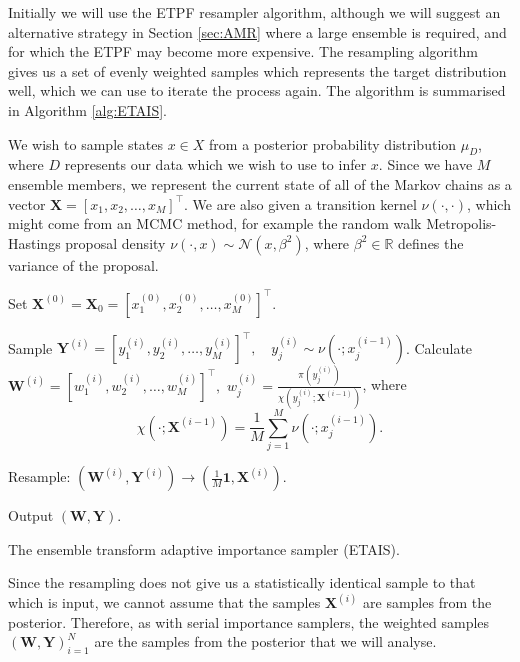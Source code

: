 \documentclass[final]{siamltex}
\newcommand{\X}{{\mathbf X}}
\newcommand{\Y}{{\mathbf Y}}
\newcommand{\W}{{\mathbf W}}
\begin{document}
Initially we
will use the ETPF resampler algorithm\cite{reich2013nonparametric}, although we
will suggest an alternative strategy in Section \ref{sec:AMR} where a
large ensemble is required, and for which the ETPF may become more expensive. The
resampling algorithm gives us a set of evenly weighted samples which
represents the target distribution well, which we can use to iterate
the process again. The algorithm is summarised in Algorithm
\ref{alg:ETAIS}.

We wish to sample states $x \in X$ from a posterior
probability distribution $\mu_D$, where $D$ represents our data which
we wish to use to infer $x$. Since we have $M$ ensemble members, we
represent the current state of all of the Markov chains as a vector
$\X = [x_1,x_2,\ldots,x_M]^\top$. We are also given a transition kernel
$\nu(\cdot,\cdot)$, which might come from an MCMC method, for example
the random walk Metropolis-Hastings proposal density $\nu(\cdot,x) \sim
\mathcal{N}(x,\beta^2)$, where $\beta^2\in \mathbb{R}$ defines the
variance of the proposal.

\begin{table}[!ht]
\centering
\begin{algorithm}[H]
\DontPrintSemicolon
\BlankLine
	Set $\X^{(0)} = \X_0 = [x_1^{(0)},x_2^{(0)},\ldots,x_M^{(0)}]^\top$.\;
	{
		Sample $\Y^{(i)} = [y_1^{(i)},y_2^{(i)},\ldots,y_M^{(i)}]^\top, \quad y_j^{(i)} \sim
\nu(\cdot;x_j^{(i-1)})$.\label{algline:ETAIS_propose}\;
		Calculate $\W^{(i)} = [w_1^{(i)},w_2^{(i)},\ldots,w_M^{(i)}]^\top,$ \quad $w^{(i)}_j =
\frac{\pi(y_j^{(i)})}{\chi(y_j^{(i)};\X^{(i-1)})}$, where
		\[
			\chi(\cdot;\X^{(i-1)}) = \frac{1}{M}\sum_{j=1}^M \nu(\cdot;x_j^{(i-1)}).
		\]

		Resample: $(\W^{(i)},\Y^{(i)}) \rightarrow (\frac{1}{M}\mathbf{1}, \X^{(i)})$.\label{algline:ETAIS_resample}\;
	}
	Output $(\W, \Y)$.\;
\caption{The ensemble transform adaptive importance sampler (ETAIS).\label{alg:ETAIS}}
\end{algorithm}
\end{table}

Since the resampling does not give us a statistically identical sample
to that which is input, we cannot assume that the samples $\X^{(i)}$
are samples from the posterior. Therefore, as with serial
importance samplers, the weighted samples
$(\W,\Y)_{i=1}^N$ are the samples from the posterior that
we will analyse.
\end{document}
